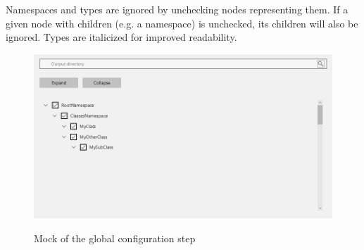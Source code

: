Namespaces and types are ignored by unchecking nodes representing them. If a given node with children (e.g. a namespace) is unchecked, its children will also be ignored. Types are italicized for improved readability.

\begin{figure}[H]
    \includegraphics[width=\linewidth]{img/mockGlobal settings.png}
    \label{fig:pluginGlobal}
    \caption{Mock of the global configuration step}
\end{figure}